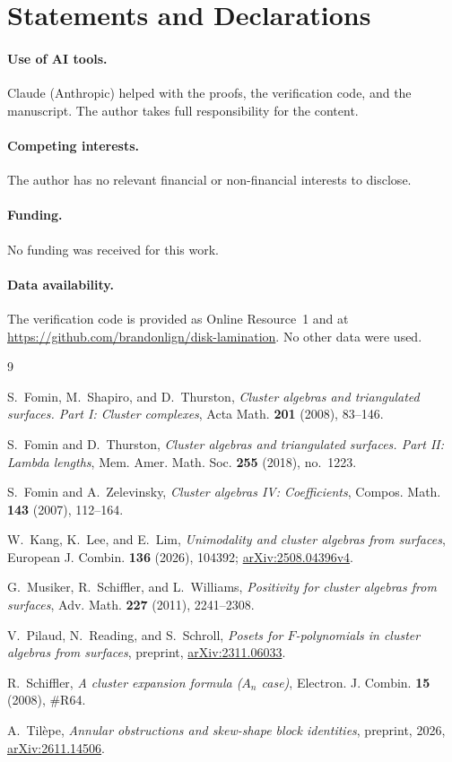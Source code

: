 \documentclass[11pt]{amsart}
\theoremstyle{remark}
\numberwithin{equation}{section}
\begin{document}
\section*{Statements and Declarations}

\paragraph{Use of AI tools.} Claude (Anthropic) helped with the proofs, the verification code, and the
manuscript. The author takes full responsibility for the content.

\paragraph{Competing interests.} The author has no relevant financial or non-financial
interests to disclose.

\paragraph{Funding.} No funding was received for this work.

\paragraph{Data availability.} The verification code is provided as Online
Resource~1 and at \url{https://github.com/brandonlign/disk-lamination}. No other data
were used.

\begin{thebibliography}{9}

S.~Fomin, M.~Shapiro, and D.~Thurston, \emph{Cluster algebras and triangulated
surfaces. {P}art {I}: Cluster complexes}, Acta Math. \textbf{201} (2008),
83--146.

S.~Fomin and D.~Thurston, \emph{Cluster algebras and triangulated surfaces.
{P}art {II}: Lambda lengths}, Mem. Amer. Math. Soc. \textbf{255} (2018),
no.~1223.

S.~Fomin and A.~Zelevinsky, \emph{Cluster algebras {IV}: Coefficients},
Compos. Math. \textbf{143} (2007), 112--164.

W.~Kang, K.~Lee, and E.~Lim, \emph{Unimodality and cluster algebras from
surfaces}, European J. Combin. \textbf{136} (2026), 104392;
\href{https://arxiv.org/abs/2508.04396v4}{arXiv:2508.04396v4}.

G.~Musiker, R.~Schiffler, and L.~Williams, \emph{Positivity for cluster
algebras from surfaces}, Adv. Math. \textbf{227} (2011), 2241--2308.

V.~Pilaud, N.~Reading, and S.~Schroll, \emph{Posets for {$F$}-polynomials in
cluster algebras from surfaces}, preprint,
\href{https://arxiv.org/abs/2311.06033}{arXiv:2311.06033}.

R.~Schiffler, \emph{A cluster expansion formula ({$A_n$} case)}, Electron. J.
Combin. \textbf{15} (2008), \#R64.

A.~Til\`epe, \emph{Annular obstructions and skew-shape block identities},
preprint, 2026, \href{https://arxiv.org/abs/2611.14506}{arXiv:2611.14506}.

\end{thebibliography}
\end{document}
